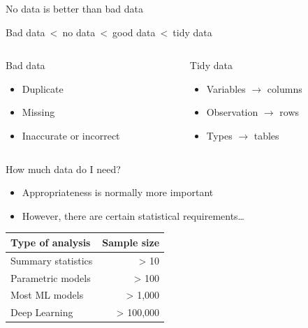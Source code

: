 \begin{frame}{No data is better than bad data}
    \begin{center}
        {\Large%
         Bad data \,<\, no data \,<\, good data \,<\, tidy data}
    \end{center}
    \vfill
    \begin{columns}
        \begin{column}{0.5\textwidth}
            \begin{block}{Bad data}
                \begin{itemize}
                    \item Duplicate
                    \item Missing
                    \item Inaccurate or incorrect
                \end{itemize}
            \end{block}
        \end{column}
        \begin{column}{0.5\textwidth}
            \begin{block}{Tidy data}
                \begin{itemize}
                    \item Variables $\to$ columns
                    \item Observation $\to$ rows
                    \item Types $\to$ tables
                \end{itemize}
            \end{block}
        \end{column}
    \end{columns}
\end{frame}

\begin{frame}{How much data do I need?}
    \begin{itemize}
        \item Appropriateness is normally more important
        \item However, there are certain statistical requirements\ldots
    \end{itemize}
    \begin{center}
        \begin{tabular}{lr}
            \toprule
            \textbf{Type of analysis} & \multicolumn{1}{l}{\textbf{Sample size}} \\
            \midrule
            Summary statistics & > 10      \\
            Parametric models  & > 100     \\
            Most ML models     & > 1,000   \\
            Deep Learning      & > 100,000 \\
            \bottomrule
        \end{tabular}
    \end{center}
\end{frame}

